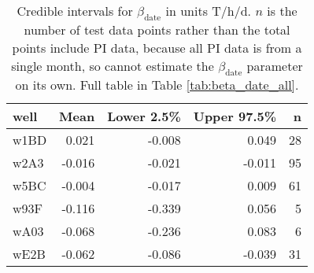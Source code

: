 \begin{table}[h]
\centering
\begin{tabular}{lrrrr}
  \hline
well & Mean & Lower 2.5\% & Upper 97.5\% & n \\ 
  \hline
w1BD & 0.021 & -0.008 & 0.049 &   28 \\ 
  w2A3 & -0.016 & -0.021 & -0.011 &   95 \\ 
  w5BC & -0.004 & -0.017 & 0.009 &   61 \\ 
  w93F & -0.116 & -0.339 & 0.056 &    5 \\ 
  wA03 & -0.068 & -0.236 & 0.083 &    6 \\ 
  wE2B & -0.062 & -0.086 & -0.039 &   31 \\ 
   \hline
\end{tabular}
\caption{Credible intervals for $\beta_\text{date}$ in units T/h/d. $n$ is the number of test data points rather than the total points include PI data, because all PI data is from a single month, so cannot estimate the $\beta_\text{date}$ parameter on its own. Full table in Table \ref{tab:beta_date_all}.} 
\label{tab:beta_date}
\end{table}
